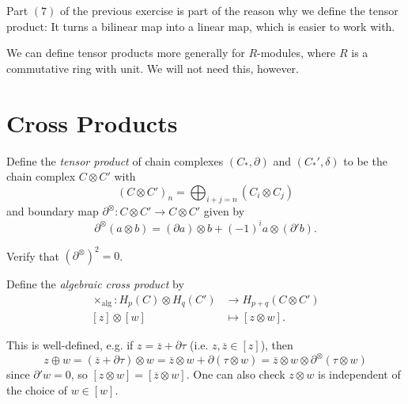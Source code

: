 \begin{remark}
  Part $(7)$ of the previous exercise is
  part of the reason why we define the tensor
  product: It turns a bilinear map into a linear
  map, which is easier to work with.
\end{remark}

\begin{remark}
  We can define tensor products more generally
  for $R$-modules, where $R$ is a
  commutative ring with unit. We will not
  need this, however.
\end{remark}

\section{Cross Products}
\begin{definition}
  Define the \emph{tensor product} of
  chain complexes $(C_*, \partial)$ and
  $(C_*', \delta)$ to be the chain complex
  $C \otimes C'$ with
  \[
    (C \otimes C')_n = \bigoplus_{i + j = n} (C_i \otimes C_j)
  \]
  and boundary map $\partial^\otimes : C \otimes C' \to C \otimes C'$
  given by
  \[
    \partial^\otimes(a \otimes b)
    = (\partial a) \otimes b + (-1)^i a \otimes (\partial' b).
  \]
\end{definition}

\begin{exercise}
  Verify that $(\partial^\otimes)^2 = 0$.
\end{exercise}

\begin{definition}
  Define the \emph{algebraic cross product} by
  \begin{align*}
    \times_{\mathrm{alg}} : H_p(C) \otimes H_q(C')
    &\longrightarrow H_{p + q}(C \otimes C') \\
    [z] \otimes [w] &\longmapsto [z \otimes w].
  \end{align*}
\end{definition}

\begin{remark}
  This is well-defined, e.g. if
  $z = \overline{z} + \partial \tau$ (i.e.
  $z, \overline{z} \in [z]$), then
  \[
    z \oplus w = (\overline{z} + \partial \tau) \otimes w
    = \overline{z} \otimes w + \partial(\tau \otimes w)
    = \overline{z} \otimes w \otimes \partial^\otimes(\tau \otimes w)
  \]
  since $\partial' w = 0$, so
  $[z \otimes w] = [\overline{z} \otimes w]$.
  One can also check $z \otimes w$ is
  independent of the choice of
  $w \in [w]$.
\end{remark}

